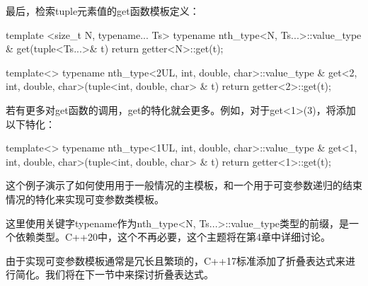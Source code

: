 最后，检索tuple元素值的get函数模板定义：

\begin{cppcode}
template <size_t N, typename... Ts>
typename nth_type<N, Ts...>::value_type &
get(tuple<Ts...>& t)
{
	return getter<N>::get(t);
}

template<>
typename nth_type<2UL, int, double, char>::value_type &
get<2, int, double, char>(tuple<int, double, char> & t)
{
	return getter<2>::get(t);
}
\end{cppcode}

若有更多对get函数的调用，get的特化就会更多。例如，对于get<1>(3)，将添加以下特化：

\begin{cppcode}
template<>
typename nth_type<1UL, int, double, char>::value_type &
get<1, int, double, char>(tuple<int, double, char> & t)
{
	return getter<1>::get(t);
}
\end{cppcode}

这个例子演示了如何使用用于一般情况的主模板，和一个用于可变参数递归的结束情况的特化来实现可变参数类模板。

这里使用关键字typename作为nth_type<N, Ts...>::value_type类型的前缀，是一个依赖类型。C++20中，这个不再必要，这个主题将在第4章中详细讨论。

由于实现可变参数模板通常是冗长且繁琐的，C++17标准添加了折叠表达式来进行简化。我们将在下一节中来探讨折叠表达式。


